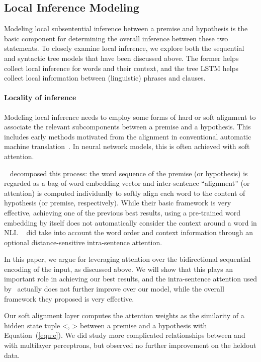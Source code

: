 \documentclass[11pt,a4paper]{article}
\begin{document}
\subsection{Local Inference Modeling}
\label{sec:local}

Modeling local subsentential inference between a premise and hypothesis is the basic component for determining the overall inference between these two statements. 
To closely examine local inference, we explore both the sequential and syntactic tree models that have been discussed above. The former helps collect local inference for words and their context, and the tree LSTM helps collect local information between (linguistic) phrases and clauses. 

\paragraph{Locality of inference}
Modeling local inference needs to employ some forms of hard or soft alignment to associate the relevant subcomponents between a premise and a hypothesis. This includes early methods motivated from the alignment in conventional automatic machine translation~\citep{MacCartneyThesis}. In neural network models, this is often achieved with soft attention. 

~\citet{Parikh:D16-1244} decomposed this process: the word sequence of the premise (or hypothesis) is regarded as a bag-of-word embedding vector and inter-sentence ``alignment'' (or attention) is computed individually to softly align each word to the content of hypothesis (or premise, respectively). While their basic framework is very effective, achieving one of the previous best results, using a pre-trained word embedding by itself does not automatically consider the context around a word in NLI. 
~\citet{Parikh:D16-1244} did take into account the word order and context information through an optional distance-sensitive intra-sentence attention. 

In this paper, we argue for leveraging attention over the bidirectional sequential encoding of the input, as discussed above. We will show that this plays an important role in achieving our best results, and the intra-sentence attention used by~\citet{Parikh:D16-1244} actually does not further improve over our model, while the overall framework they proposed is very effective. 

Our soft alignment layer computes the attention weights as the similarity of a hidden state tuple <, > between a premise and a hypothesis with Equation~(\ref{equ:e}). We did study more complicated relationships between  and  with multilayer perceptrons, but observed no further improvement on the heldout data.
\end{document}
